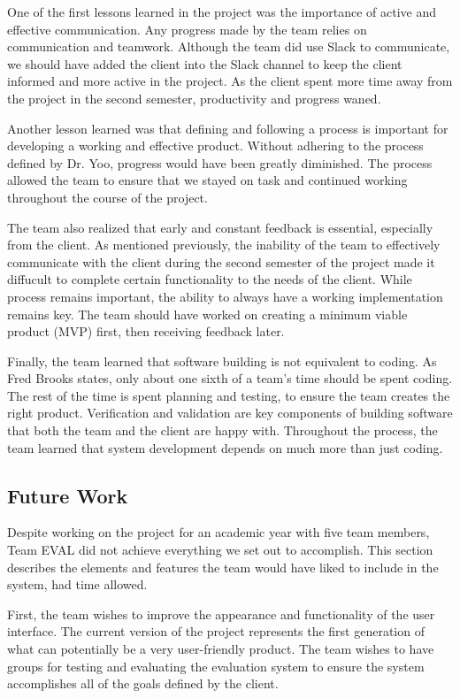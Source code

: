 \documentclass{article}
\begin{document}
One of the first lessons learned in the project was the importance of active and effective communication. Any progress made by the team relies on communication and teamwork. Although the team did use Slack to communicate, we should have added the client into the Slack channel to keep the client informed and more active in the project. As the client spent more time away from the project in the second semester, productivity and progress waned.

Another lesson learned was that defining and following a process is important for developing a working and effective product. Without adhering to the process defined by Dr. Yoo, progress would have been greatly diminished. The process allowed the team to ensure that we stayed on task and continued working throughout the course of the project. 

The team also realized that early and constant feedback is essential, especially from the client. As mentioned previously, the inability of the team to effectively communicate with the client during the second semester of the project made it diffucult to complete certain functionality to the needs of the client. While process remains important, the ability to always have a working implementation remains key. The team should have worked on creating a minimum viable product (MVP) first, then receiving feedback later. 

Finally, the team learned that software building is not equivalent to coding. As Fred Brooks states, only about one sixth of a team's time should be spent coding. The rest of the time is spent planning and testing, to ensure the team creates the right product. Verification and validation are key components of building software that both the team and the client are happy with. Throughout the process, the team learned that system development depends on much more than just coding. 

\subsection{Future Work}

Despite working on the project for an academic year with five team members, Team EVAL did not achieve everything we set out to accomplish. This section describes the elements and features the team would have liked to include in the system, had time allowed. 

First, the team wishes to improve the appearance and functionality of the user interface. The current version of the project represents the first generation of what can potentially be a very user-friendly product. The team wishes to have groups for testing and evaluating the evaluation system to ensure the system accomplishes all of the goals defined by the client. 
\end{document}
